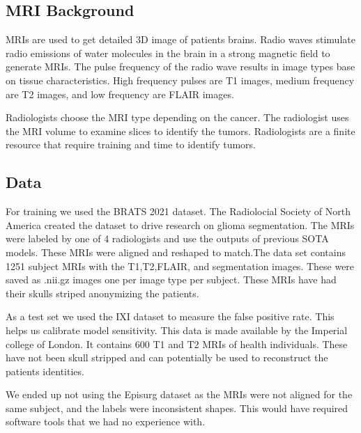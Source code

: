 \documentclass[10pt,twocolumn,letterpaper]{article}
\begin{document}
\subsection{MRI Background}

MRIs are used to get detailed 3D image of patients brains. Radio waves stimulate radio emissions of water molecules in the brain in a strong magnetic field to generate MRIs. The pulse frequency of the radio wave results in image types base on tissue characteristics. High frequency pulses are T1 images, medium frequency are T2 images, and low frequency are FLAIR images\cite{MRI}.

Radiologists choose the MRI type depending on the cancer. The radiologist uses the MRI volume to examine slices to identify the tumors. Radiologists are a finite resource that require training and time to identify tumors\cite{RAD}.


\subsection{Data}

For training we used the BRATS 2021 dataset\cite{BRATS}. The Radiolocial Society of North America created the dataset to drive research on glioma segmentation. The MRIs were labeled by one of 4 radiologists and use the outputs of previous SOTA models. These MRIs were aligned and reshaped to match.The data set contains 1251 subject MRIs with the T1,T2,FLAIR, and segmentation images. These were saved as .nii.gz images one per image type per subject. These MRIs have had their skulls striped anonymizing the patients.

As a test set we used the IXI dataset \cite{IXI} to measure the false positive rate. This helps us calibrate model sensitivity. This data is made available by the Imperial college of London. It contains 600 T1 and T2 MRIs of health individuals. These have not been skull stripped and can potentially be used to reconstruct the patients identities. 

We ended up not using the Episurg dataset\cite{EPI} as the MRIs were not aligned for the same subject, and the labels were inconsistent shapes. This would have required software tools that we had no experience with.


\end{document}

